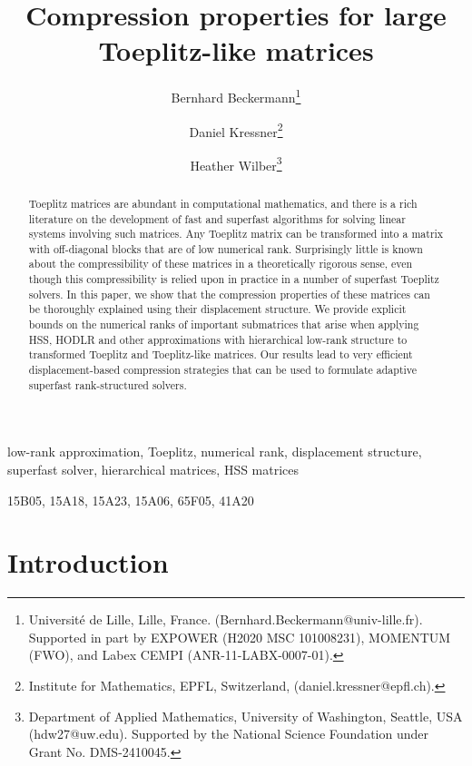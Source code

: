 \documentclass[final,reqno,onefignum,onetabnum]{siamart190516}
\title{Compression properties for large Toeplitz-like matrices}
\author{Bernhard Beckermann\thanks{Universit\'{e} de Lille, Lille, France. (Bernhard.Beckermann@univ-lille.fr). Supported in part by EXPOWER (H2020 MSC 101008231), MOMENTUM (FWO), and Labex CEMPI (ANR-11-LABX-0007-01).} \and
Daniel Kressner\thanks{Institute for Mathematics, EPFL, Switzerland, (daniel.kressner@epfl.ch).} \and
Heather Wilber\thanks{Department of Applied Mathematics, University of Washington, Seattle, USA (hdw27@uw.edu). Supported by the National Science Foundation under Grant No. DMS-2410045.} }
\begin{document}
\maketitle

\begin{abstract} 
Toeplitz matrices are abundant in computational mathematics, and there is a rich literature on the development of fast and superfast algorithms for solving linear systems involving such matrices.
Any Toeplitz matrix can be transformed into a matrix with off-diagonal blocks that are of low numerical rank.
Surprisingly little is known about the compressibility of these matrices in a theoretically rigorous sense, even though this compressibility is relied upon in practice in a number of superfast Toeplitz solvers. In this paper, we show that the compression properties of these matrices can be thoroughly explained using their displacement structure. We provide explicit bounds on the numerical ranks of important submatrices that arise when applying HSS, HODLR and other approximations with hierarchical low-rank structure to transformed Toeplitz and Toeplitz-like matrices. Our results lead to very efficient displacement-based compression strategies that can be used to formulate adaptive superfast rank-structured solvers. 
\end{abstract}

\begin{keywords}
low-rank approximation, Toeplitz, numerical rank, displacement structure, superfast solver, hierarchical matrices, HSS matrices
\end{keywords}

\begin{AMS}
15B05, 15A18, 15A23, 15A06, 65F05, 41A20
\end{AMS}


\section{Introduction}
\end{document}
